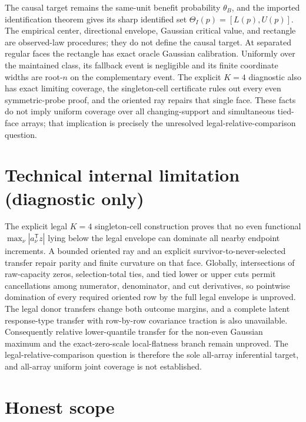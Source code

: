 \documentclass{article}
\begin{document}
The causal target remains the same-unit benefit probability \(\theta_B\), and the imported identification theorem gives its sharp identified set \(\Theta_I(p)=[L(p),U(p)]\). The empirical center, directional envelope, Gaussian critical value, and rectangle are observed-law procedures; they do not define the causal target. At separated regular faces the rectangle has exact oracle Gaussian calibration. Uniformly over the maintained class, its fallback event is negligible and its finite coordinate widths are root-\(n\) on the complementary event. The explicit \(K=4\) diagnostic also has exact limiting coverage, the singleton-cell certificate rules out every even symmetric-probe proof, and the oriented ray repairs that single face. These facts do not imply uniform coverage over all changing-support and simultaneous tied-face arrays; that implication is precisely the unresolved legal-relative-comparison question.

\section*{Technical internal limitation (diagnostic only)}

The explicit legal \(K=4\) singleton-cell construction proves that no even functional \(\max_\nu|a_\nu^{\mathsf T}z|\) lying below the legal envelope can dominate all nearby endpoint increments. A bounded oriented ray and an explicit survivor-to-never-selected transfer repair parity and finite curvature on that face. Globally, intersections of raw-capacity zeros, selection-total ties, and tied lower or upper cuts permit cancellations among numerator, denominator, and cut derivatives, so pointwise domination of every required oriented row by the full legal envelope is unproved. The legal donor transfers change both outcome margins, and a complete latent response-type transfer with row-by-row covariance traction is also unavailable. Consequently relative lower-quantile transfer for the non-even Gaussian maximum and the exact-zero-scale local-flatness branch remain unproved. The legal-relative-comparison question is therefore the sole all-array inferential target, and all-array uniform joint coverage is not established.

\section{Honest scope}
\end{document}
